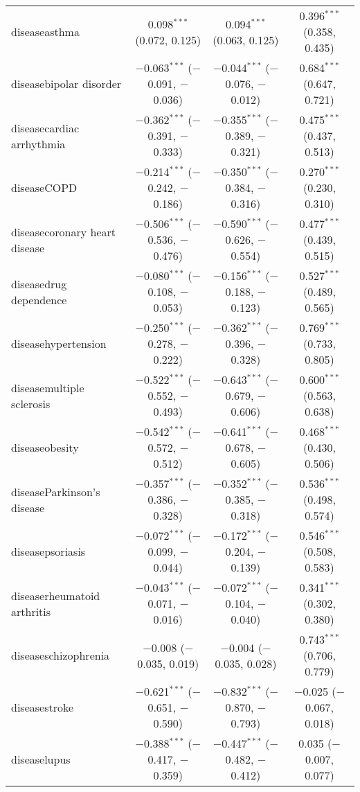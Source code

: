 \begin{table}[!htbp]
\begin{tabular}{@{\extracolsep{5pt}}lccc}
  diseaseasthma & 0.098$^{***}$ (0.072, 0.125) & 0.094$^{***}$ (0.063, 0.125) & 0.396$^{***}$ (0.358, 0.435) \\ 
  diseasebipolar disorder & $-$0.063$^{***}$ ($-$0.091, $-$0.036) & $-$0.044$^{***}$ ($-$0.076, $-$0.012) & 0.684$^{***}$ (0.647, 0.721) \\ 
  diseasecardiac arrhythmia & $-$0.362$^{***}$ ($-$0.391, $-$0.333) & $-$0.355$^{***}$ ($-$0.389, $-$0.321) & 0.475$^{***}$ (0.437, 0.513) \\ 
  diseaseCOPD & $-$0.214$^{***}$ ($-$0.242, $-$0.186) & $-$0.350$^{***}$ ($-$0.384, $-$0.316) & 0.270$^{***}$ (0.230, 0.310) \\ 
  diseasecoronary heart disease & $-$0.506$^{***}$ ($-$0.536, $-$0.476) & $-$0.590$^{***}$ ($-$0.626, $-$0.554) & 0.477$^{***}$ (0.439, 0.515) \\ 
  diseasedrug dependence & $-$0.080$^{***}$ ($-$0.108, $-$0.053) & $-$0.156$^{***}$ ($-$0.188, $-$0.123) & 0.527$^{***}$ (0.489, 0.565) \\ 
  diseasehypertension & $-$0.250$^{***}$ ($-$0.278, $-$0.222) & $-$0.362$^{***}$ ($-$0.396, $-$0.328) & 0.769$^{***}$ (0.733, 0.805) \\ 
  diseasemultiple sclerosis & $-$0.522$^{***}$ ($-$0.552, $-$0.493) & $-$0.643$^{***}$ ($-$0.679, $-$0.606) & 0.600$^{***}$ (0.563, 0.638) \\ 
  diseaseobesity & $-$0.542$^{***}$ ($-$0.572, $-$0.512) & $-$0.641$^{***}$ ($-$0.678, $-$0.605) & 0.468$^{***}$ (0.430, 0.506) \\ 
  diseaseParkinson's disease & $-$0.357$^{***}$ ($-$0.386, $-$0.328) & $-$0.352$^{***}$ ($-$0.385, $-$0.318) & 0.536$^{***}$ (0.498, 0.574) \\ 
  diseasepsoriasis & $-$0.072$^{***}$ ($-$0.099, $-$0.044) & $-$0.172$^{***}$ ($-$0.204, $-$0.139) & 0.546$^{***}$ (0.508, 0.583) \\ 
  diseaserheumatoid arthritis & $-$0.043$^{***}$ ($-$0.071, $-$0.016) & $-$0.072$^{***}$ ($-$0.104, $-$0.040) & 0.341$^{***}$ (0.302, 0.380) \\ 
  diseaseschizophrenia & $-$0.008 ($-$0.035, 0.019) & $-$0.004 ($-$0.035, 0.028) & 0.743$^{***}$ (0.706, 0.779) \\ 
  diseasestroke & $-$0.621$^{***}$ ($-$0.651, $-$0.590) & $-$0.832$^{***}$ ($-$0.870, $-$0.793) & $-$0.025 ($-$0.067, 0.018) \\ 
  diseaselupus & $-$0.388$^{***}$ ($-$0.417, $-$0.359) & $-$0.447$^{***}$ ($-$0.482, $-$0.412) & 0.035 ($-$0.007, 0.077) \\ 

\end{tabular}
\end{table}
